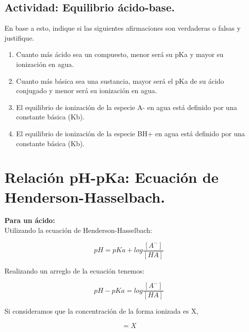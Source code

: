 \documentclass[12pt,a4paper]{article}
\begin{document}
	
	\subsection{Actividad: Equilibrio ácido-base.}
	
	En base a esto, indique si las siguientes afirmaciones son verdaderas o falsas y justifique.
	
		\begin{enumerate}
			\item Cuanto más ácido sea un compuesto, menor será su pKa y mayor su ionización en agua.

			\item Cuanto más básica sea una sustancia, mayor será el pKa de su ácido conjugado y menor será su ionización en agua.
						
			\item El equilibrio de ionización de la especie A- en agua está definido por una constante básica (Kb).
			
			\item El equilibrio de ionización de la especie BH+ en agua está definido por una constante básica (Kb).
		\end{enumerate}	



\section{Relación pH-pKa: Ecuación de Henderson-Hasselbach.}

\textbf{Para un ácido:}\\

Utilizando la ecuación de Henderson-Hasselbach:

	\begin{equation}
		pH = pKa + log \frac{[A^-]}{[HA]}
		\label{eqn:Henderson-Hasselbach_acido_1}
	\end{equation}

Realizando un arreglo de la ecuación tenemos:

	\begin{equation}
		\boxed{pH - pKa = log \frac{[A^-]}{[HA]}}
		\label{eqn:Henderson-Hasselbach_acido_2}
	\end{equation}

Si consideramos que la concentración de la forma ionizada es X,

	\begin{equation*}
		[A^-] = X
	\end{equation*}
\end{document}
